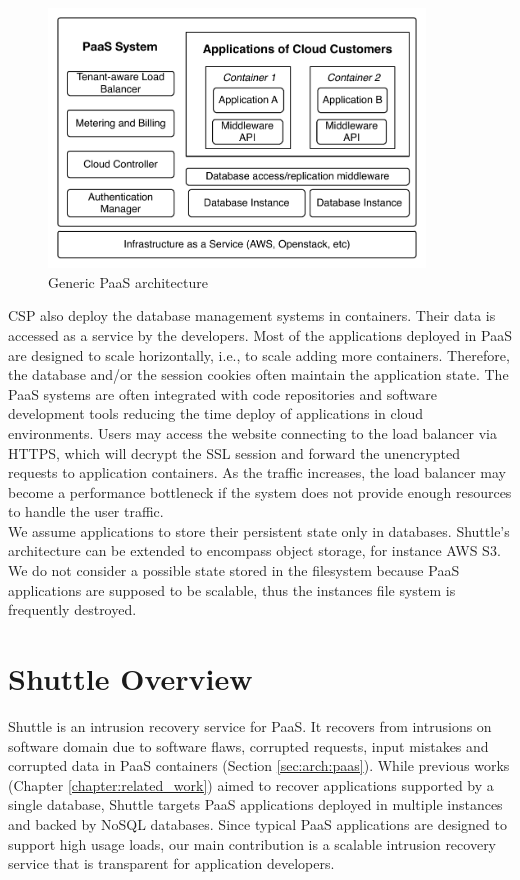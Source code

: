 \begin{figure}
\centering
\includegraphics[width=100mm]{images/paas}
\caption{Generic \ac{PaaS} architecture}
\label{fig:paasArchitecture}
\end{figure}

\ac{CSP} also deploy the database management systems in containers. Their data is accessed as a service by the developers. Most of the applications deployed in \ac{PaaS} are designed to scale horizontally, i.e., to scale adding more containers. Therefore, the database and/or the session cookies often maintain the application state. The \ac{PaaS} systems are often integrated with code repositories and software development tools reducing the time deploy of applications in cloud environments. Users may access the website connecting to the load balancer via \ac{HTTPS}, which will decrypt the \ac{SSL} session and forward the unencrypted requests to application containers. As the traffic increases, the load balancer may become a performance bottleneck if the system does not provide enough resources to handle the user traffic.\\

We assume applications to store their persistent state only in databases. Shuttle's architecture can be extended to encompass object storage, for instance \ac{AWS} \ac{S3}. We do not consider a possible state stored in the filesystem because \ac{PaaS} applications are supposed to be scalable, thus the instances file system is frequently destroyed.

\FloatBarrier
\section{Shuttle Overview}
\label{sec:arch:overview}
Shuttle is an intrusion recovery service for \ac{PaaS}. It recovers from intrusions on software domain due to software flaws, corrupted requests, input mistakes and corrupted data in \ac{PaaS} containers (Section \ref{sec:arch:paas}). While previous works (Chapter \ref{chapter:related_work}) aimed to recover applications supported by a single database, Shuttle targets \ac{PaaS} applications deployed in multiple instances and backed by \acs{NoSQL} databases. Since typical \ac{PaaS} applications are designed to support high usage loads, our main contribution is a scalable intrusion recovery service that is transparent for application developers. 

